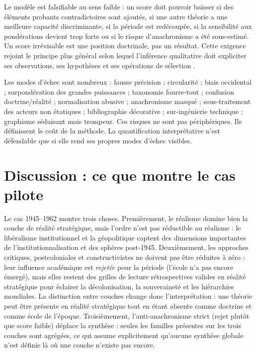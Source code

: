 \documentclass[11pt,a4paper]{article}
\begin{document}
Le modèle est falsifiable au sens faible : un score doit pouvoir baisser si des éléments probants contradictoires sont ajoutés, si une autre théorie a une meilleure capacité discriminante, si la période est redécoupée, si la sensibilité aux pondérations devient trop forte ou si le risque d'anachronisme a été sous-estimé. Un score irrévisable est une position doctrinale, pas un résultat. Cette exigence rejoint le principe plus général selon lequel l'inférence qualitative doit expliciter ses observations, ses hypothèses et ses opérations de sélection \citep{king1994designing}.

Les modes d'échec sont nombreux : fausse précision ; circularité ; biais occidental ; surpondération des grandes puissances ; taxonomie fourre-tout ; confusion doctrine/réalité ; normalisation abusive ; anachronisme masqué ; sous-traitement des acteurs non étatiques ; bibliographie décorative ; sur-ingénierie technique ; graphisme séduisant mais trompeur. Ces risques ne sont pas périphériques. Ils définissent le coût de la méthode. La quantification interprétative n'est défendable que si elle rend ses propres modes d'échec visibles.

\section{Discussion : ce que montre le cas pilote}

Le cas 1945--1962 montre trois choses. Premièrement, le réalisme domine bien la couche de réalité stratégique, mais l'ordre n'est pas réductible au réalisme : le libéralisme institutionnel et la géopolitique captent des dimensions importantes de l'institutionnalisation et des sphères post-1945. Deuxièmement, les approches critiques, postcoloniales et constructivistes ne doivent pas être réduites à zéro : leur influence académique est \emph{rejetée} pour la période (l'école n'a pas encore émergé), mais elles restent des grilles de lecture rétrospectives valides en réalité stratégique pour éclairer la décolonisation, la souveraineté et les hiérarchies mondiales. La distinction entre couches change donc l'interprétation : une théorie peut être présente en réalité stratégique tout en étant absente comme doctrine et comme école de l'époque. Troisièmement, l'anti-anachronisme strict (rejet plutôt que score faible) déplace la synthèse : seules les familles présentes sur les trois couches sont agrégées, ce qui assume explicitement qu'aucune synthèse globale n'est définie là où une couche n'existe pas encore.
\end{document}
